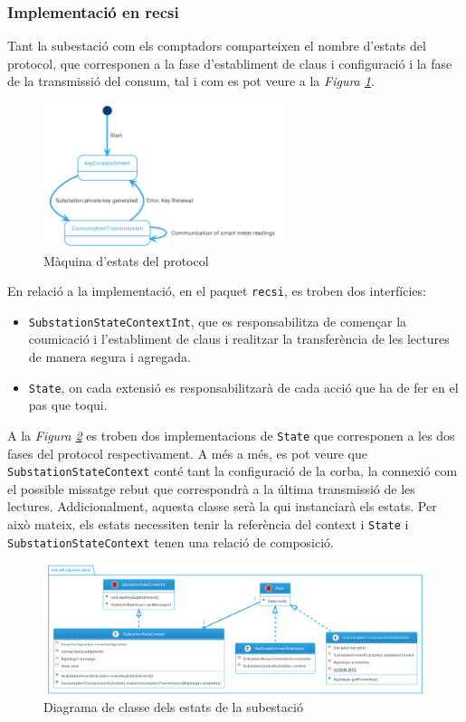 \subsubsection{Implementació en recsi}
Tant la subestació com els comptadors comparteixen el nombre d'estats del protocol, que corresponen a la fase d'establiment de claus i configuració i la fase de la transmissió del consum, tal i com es pot veure a la \textit{Figura \ref{fig:recsi-state}}.
\begin{figure}[H]
	\centering
	\includegraphics[width=7cm]{classes/recsistate.png}
	\caption{Màquina d'estats del protocol \cite{recsi}}
	\label{fig:recsi-state}
\end{figure}
En relació a la implementació, en el paquet \texttt{recsi}, es troben dos interfícies:
\begin{itemize}
	\item \texttt{SubstationStateContextInt}, que es responsabilitza de començar la coumicació i l'establiment de claus i realitzar la transferència de les lectures de manera segura i agregada.
	\item \texttt{State}, on cada extensió es responsabilitzarà de cada acció que ha de fer en el pas que toqui.
\end{itemize}
A la \textit{Figura \ref{fig:recsi}} es troben dos implementacions de \texttt{State} que corresponen a les dos fases del protocol respectivament. A més a més, es pot veure que \texttt{SubstationStateContext} conté tant la configuració de la corba, la connexió com el possible missatge rebut que correspondrà a la última transmissió de les lectures. Addicionalment, aquesta classe serà la qui instanciarà els estats. Per això mateix, els estats necessiten tenir la referència del context i \texttt{State} i \texttt{SubstationStateContext} tenen una relació de composició. 
\begin{figure}[H]
	\centering
	\includegraphics[width=16cm]{classes/recsi.png}
	\caption{Diagrama de classe dels estats de la subestació}
	\label{fig:recsi}
\end{figure}
